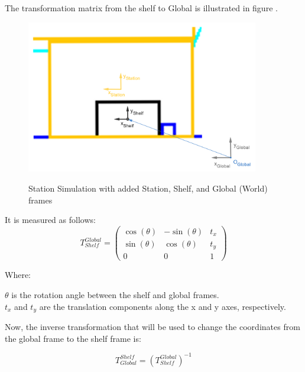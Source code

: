The transformation matrix from the shelf to Global is illustrated in figure .

\begin{figure}[H]
    \begin{center}
        \includegraphics[width=4in]{images/Chap2/station_frames.png}\\
        \caption{Station Simulation with added Station, Shelf, and Global (World) frames}
        \label{Station}
        \end{center}    
\end{figure}

It is measured as follows:
\begin{equation}
    T_{Shelf}^{Global} = 
    \begin{pmatrix}
    \cos(\theta) & -\sin(\theta) & t_x \\
    \sin(\theta) & \cos(\theta) & t_y \\
    0 & 0 & 1
    \label{shToGlob}
    \end{pmatrix}
    \end{equation}
    
    \noindent Where:
    
    \noindent $\theta$ is the rotation angle between the shelf and global frames. \\

    \noindent $t_x$ and $t_y$ are the translation components along the x and y axes, respectively.
    
    \vspace{1em} 
Now, the inverse transformation that will be used to change the coordinates from 
the global frame to the shelf frame is:
    
    \begin{equation}
    T_{Global}^{Shelf} = \left( T_{Shelf}^{Global} \right)^{-1}
    \end{equation}

